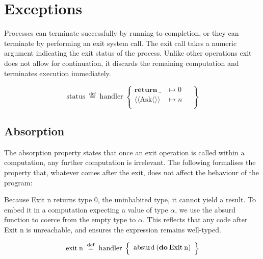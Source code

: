 \documentclass[logo,bsc,singlespacing,parskip]{infthesis}
\begin{document}
\section{Exceptions}
Processes can terminate successfully by running to completion, or they can terminate by performing an exit system call. The exit call takes a numeric argument indicating the exit status of the process. Unlike other operations exit does not allow for continuation, it discards the remaining computation and terminates execution immediately.



\[
\mathrm{status} \;\overset{\mathrm{def}}{=}\;
\mathrm{handler} \;\left\{
\begin{array}{ll}
  \mathrm{\textbf{return}\:\_} & \mapsto 0 \quad\\[0.5ex]
  \langle\!\langle \mathrm{Ask} \langle\rangle\rangle &  \mapsto n \quad\\[0.5ex]
 
\end{array}
\right\}
\]







\subsection*{Absorption}

The absorption property states that once an exit operation is called within a computation, any further computation is irrelevant. The following formalises the property that, whatever comes after the exit, does not affect the behaviour of the program:


Because Exit n returns type 0, the uninhabited type, it cannot yield a result. To embed it in a computation expecting a value of type $\alpha$, we use the absurd function to coerce from the empty type to $\alpha$. This reflects that any code after Exit n is unreachable, and ensures the expression remains well-typed.






\[
\mathrm{exit\:n} \;\overset{\mathrm{def}}{=}\;
\mathrm{handler} \;\left\{
\begin{array}{l}
  \text{absurd\:(\textbf{do}\:Exit\:n)} \quad\\[0.5ex]

\end{array}
\right\}
\]
\end{document}

